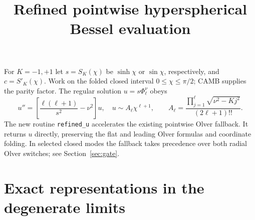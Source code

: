 \documentclass[10pt]{article}
\title{Refined pointwise hyperspherical Bessel evaluation}
\author{}
\date{}
\begin{document}
\maketitle
\vspace{-2em}
For $K=-1,+1$ let $s=S_K(\chi)$ be $\sinh\chi$ or $\sin\chi$, respectively,
and $c=S'_K(\chi)$. Work on the folded closed interval $0\leq\chi\leq\pi/2$;
CAMB supplies the parity factor. The regular solution $u=s\Phi_\ell^\nu$ obeys
\begin{equation}
 u''=\left[\frac{\ell(\ell+1)}{s^2}-\nu^2\right]u,
 \quad u\sim A_\ell\chi^{\ell+1},\qquad
 A_\ell=\frac{\prod_{j=1}^{\ell}\sqrt{\nu^2-Kj^2}}{(2\ell+1)!!}.
 \label{eq:radial}
\end{equation}
The new routine \texttt{refined\_u} accelerates the existing pointwise Olver
fallback. It returns $u$ directly, preserving the flat and leading Olver
formulas and coordinate folding. In selected closed modes the fallback
takes precedence over both radial Olver switches; see Section~\ref{sec:gate}.

\section{Exact representations in the degenerate limits}
\end{document}
